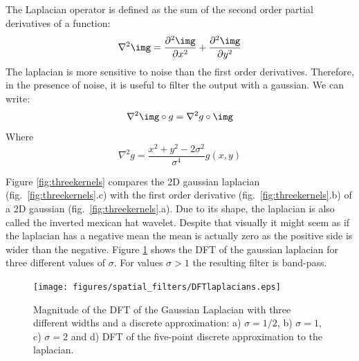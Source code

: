 The Laplacian operator is defined as the sum of the second order partial derivatives of a function:
\begin{equation}
	\nabla^2 \img = \frac{\partial^2 \img}{\partial x^2} + \frac{\partial^2 \img}{\partial y^2}
\end{equation}
The laplacian is more sensitive to noise than the first order derivatives. Therefore, in the presence of noise, it is useful to filter the output with a gaussian. We can write:
\begin{equation}
	\nabla^2 \img \circ g = \nabla^2 g \circ \img
\end{equation}
Where
\begin{equation}
	\nabla^2 g = \frac{x^2 + y^2 -2\sigma^2}{\sigma^4} g(x,y)
\end{equation}

Figure \ref{fig:threekernels} compares the 2D gaussian laplacian (fig.~\ref{fig:threekernels}.c) with the first order derivative (fig.~\ref{fig:threekernels}.b) of a 2D gaussian (fig.~\ref{fig:threekernels}.a). Due to its shape, the laplacian is also called the inverted mexican hat wavelet. Despite that visually it might seem as if the laplacian has a negative mean the mean is actually zero as the positive side is wider than the negative. Figure \ref{fig:DFTlaplacians} shows the DFT of the gaussian laplacian for three different values of $\sigma$. For values $\sigma>1$ the resulting filter is band-pass.

\begin{figure}
	\centerline{
		\texttt{[image: figures/spatial\_filters/DFTlaplacians.eps]}}
	\caption{Magnitude of the DFT of the Gaussian Laplacian with three different widths and a discrete approximation: a) $\sigma=1/2$, b) $\sigma=1$, c) $\sigma=2$ and d) DFT of the five-point discrete approximation to the laplacian.
	}
	\label{fig:DFTlaplacians}
\end{figure}

